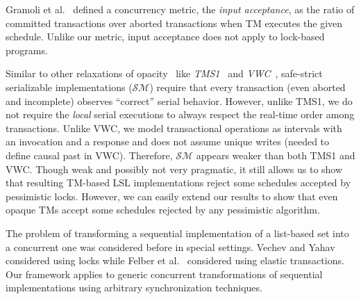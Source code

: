 \documentclass[11pt,pdftex,letterpaper]{article}
\newcommand{\petr}[1]{{\bf (((PK: #1)))}}
\newcommand{\ignore}[1]{}
\begin{document}
Gramoli et al.~\cite{GHF10} defined a concurrency metric, the \emph{input
acceptance}, as the ratio of committed transactions over aborted
transactions when TM executes the given schedule.   
Unlike our metric, input acceptance does not apply to
lock-based programs. 


\ignore{ 
A quite different but popular concurrency notion, called
\emph{disjoint-access parallelism}~\cite{israeli-disjoint}, 
was recently considered in the TM context~\cite{AHM09,EFKMT12}.
A TM is disjoint-access parallel (DAP) if it guarantees 
that two transactions accessing the same meta-data also access 
the same transactional object. 
Our concurrency metric not only applies to lock-based implementations but is also
more fine-grained ones \petr{did not get this point}
as it allows to determine relative concurrency provided 
by different DAP implementations.
}


Similar to other relaxations of opacity~\cite{tm-book} like \emph{TMS1}~\cite{TMS09} and \emph{VWC}~\cite{damien-vw},  
safe-strict serializable implementations ($\mathcal{SM}$) require that every transaction (even aborted and incomplete) observes
``correct'' serial behavior. 
However, unlike TMS1, we do not require the \emph{local} serial executions
to always respect the real-time order among transactions. Unlike VWC, we model transactional
operations as intervals with an invocation and a response and does not
assume unique writes (needed to define causal past in VWC). 
Therefore, $\mathcal{SM}$ appears weaker than both TMS1 and VWC.
Though weak and possibly not very pragmatic, it still allows us 
to show that resulting TM-based LSL implementations 
reject some schedules accepted by pessimistic locks. 
However, we can easily extend our results to show that even opaque TMs accept
some schedules rejected by any pessimistic algorithm.   
    
The problem of transforming a
sequential implementation of a list-based set into a concurrent
one was considered before in special settings.
Vechev and Yahav~\cite{vechev08} considered using locks while Felber et al.~\cite{FGG09} considered using elastic transactions.
Our framework applies to generic
concurrent transformations of sequential implementations
using arbitrary synchronization techniques. 
\end{document}
